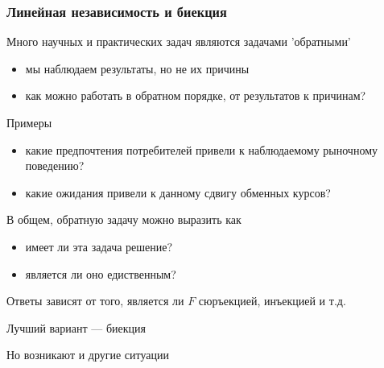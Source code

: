 \begin{frame}
    
    \frametitle{Линейная независимость и биекция}

    \vspace{.7em}
    Много научных и практических задач являются задачами 'обратными'

    \begin{itemize}
        \item мы наблюдаем результаты, но не их причины
        \item как можно работать в обратном порядке, от результатов к причинам?
    \end{itemize}
    
    Примеры

    \begin{itemize}
        \item какие предпочтения потребителей привели к наблюдаемому рыночному поведению?
        \item какие ожидания привели к данному сдвигу обменных курсов?
    \end{itemize}

\end{frame}

\begin{frame}
    
    \vspace{2em}
    В общем, обратную задачу можно выразить как
    
    \begin{figure}
       \begin{center}
        \scalebox{.5}{}
       \end{center}
    \end{figure}

    \begin{itemize}
        \item имеет ли эта задача решение?
        \item является ли оно едиственным?
    \end{itemize}

    Ответы зависят от того, является ли $F$ сюръекцией, инъекцией и т.д. 

    Лучший вариант --- биекция

    Но возникают и другие ситуации

\end{frame}

